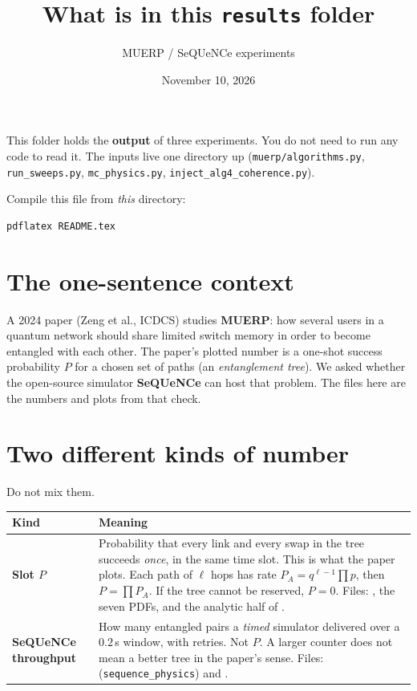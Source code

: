 \documentclass[11pt]{article}
\title{What is in this \texttt{results} folder}
\author{MUERP / SeQUeNCe experiments}
\date{November 10, 2026}
\begin{document}
\maketitle

This folder holds the \textbf{output} of three experiments.
You do not need to run any code to read it.
The inputs live one directory up (\texttt{muerp/algorithms.py}, \texttt{run\_sweeps.py}, \texttt{mc\_physics.py}, \texttt{inject\_alg4\_coherence.py}).

Compile this file from \emph{this} directory:
\begin{verbatim}
pdflatex README.tex
\end{verbatim}

\section{The one-sentence context}

A 2024 paper (Zeng et al., ICDCS) studies \textbf{MUERP}: how several users in a quantum network should share limited switch memory in order to become entangled with each other.
The paper's plotted number is a one-shot success probability $P$ for a chosen set of paths (an \emph{entanglement tree}).
We asked whether the open-source simulator \textbf{SeQUeNCe} can host that problem.
The files here are the numbers and plots from that check.

\section{Two different kinds of number}

Do not mix them.

{\small
\begin{tabularx}{\textwidth}{@{}P{1.35in} Y@{}}
\toprule
Kind & Meaning \\
\midrule
\textbf{Slot $P$}
  & Probability that every link and every swap in the tree succeeds \emph{once}, in the same time slot.
    This is what the paper plots.
    Each path of $\ell$ hops has rate $P_A = q^{\ell-1}\prod p$, then $P=\prod P_A$.
    If the tree cannot be reserved, $P=0$.
    Files: , the seven PDFs, and the analytic half of . \\
\addlinespace
\textbf{SeQUeNCe throughput}
  & How many entangled pairs a \emph{timed} simulator delivered over a $0.2$\,s window, with retries.
    Not $P$. A larger counter does not mean a better tree in the paper's sense.
    Files:  (\texttt{sequence\_physics}) and . \\
\bottomrule
\end{tabularx}}
\end{document}
